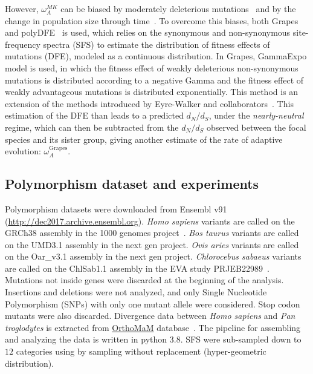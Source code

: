 \documentclass{article}
\newcommand{\dn}{d_N}
\newcommand{\ds}{d_S}
\newcommand{\dnds}{\dn / \ds}
\begin{document}
However, $\omega_A^{MK}$ can be biased by moderately deleterious mutations~\citep{eyre-walker_quantifying_2002} and by the change in population size through time~\citep{eyre-walker_changing_2002}.
To overcome this biases, both Grapes~\citep{galtier_adaptive_2016} and polyDFE~\citep{tataru_polydfe_2020} is used, which relies on the synonymous and non-synonymous site-frequency spectra (SFS) to estimate the distribution of fitness effects of mutations (DFE), modeled as a continuous distribution.
In Grapes, GammaExpo model is used, in which the fitness effect of weakly deleterious non-synonymous mutations is distributed according to a negative Gamma and the fitness effect of weakly advantageous mutations is distributed exponentially.
This method is an extension of the methods introduced by Eyre-Walker and collaborators~\citep{eyre-walker_distribution_2006, eyre-walker_estimating_2009}.
This estimation of the DFE than leads to a predicted $\dnds$, under the \textit{nearly-neutral} regime, which can then be subtracted from the $\dnds$ observed between the focal species and its sister group, giving another estimate of the rate of adaptive evolution: $\omega_A^{\text{Grapes}}$.

\subsection*{Polymorphism dataset and experiments}
Polymorphism datasets were downloaded from Ensembl v91 (\url{http://dec2017.archive.ensembl.org}).
\textit{Homo sapiens} variants are called on the GRCh38 assembly in the 1000 genomes project~\citep{consortium_integrated_2012, the_1000_genomes_project_consortium_global_2015}.
\textit{Bos taurus} variants are called on the UMD3.1 assembly in the next gen project.
\textit{Ovis aries} variants are called on the Oar\_v3.1 assembly in the next gen project.
\textit{Chlorocebus sabaeus} variants are called on the ChlSab1.1 assembly in the EVA study PRJEB22989~\citep{svardal_ancient_2017}.
Mutations not inside genes were discarded at the beginning of the analysis.
Insertions and deletions were not analyzed, and only Single Nucleotide Polymorphism (SNPs) with only one mutant allele were considered.
Stop codon mutants were also discarded.
Divergence data between \textit{Homo sapiens} and \textit{Pan troglodytes} is extracted from \href{http://www.orthomam.univ-montp2.fr}{OrthoMaM} database~\citep{ranwez_orthomam_2007, douzery_orthomam_2014, scornavacca_orthomam_2019}.
The pipeline for assembling and analyzing the data is written in python 3.8.
SFS were sub-sampled down to $12$ categories using by sampling without replacement (hyper-geometric distribution).
\end{document}
